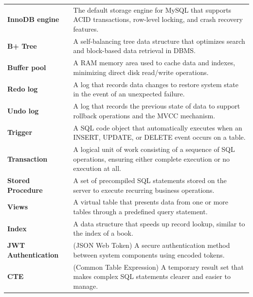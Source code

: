 \documentclass[12pt, a4paper]{report}
\begin{document}
\begin{center}
\begin{tcolorbox}
\begin{tabularx}{\textwidth}{>{\hspace{1em}\bfseries\color{textgreen}}l X<{\hspace{1em}}}
            InnoDB engine & The default storage engine for MySQL that supports ACID transactions, row-level locking, and crash recovery features. \\
            
            B+ Tree & A self-balancing tree data structure that optimizes search and block-based data retrieval in DBMS. \\
            
            Buffer pool & A RAM memory area used to cache data and indexes, minimizing direct disk read/write operations. \\
            
            Redo log & A log that records data changes to restore system state in the event of an unexpected failure. \\
            
            Undo log & A log that records the previous state of data to support rollback operations and the MVCC mechanism. \\
            
            Trigger & A SQL code object that automatically executes when an INSERT, UPDATE, or DELETE event occurs on a table. \\
            
            Transaction & A logical unit of work consisting of a sequence of SQL operations, ensuring either complete execution or no execution at all. \\
            
            Stored Procedure & A set of precompiled SQL statements stored on the server to execute recurring business operations. \\
            
            Views & A virtual table that presents data from one or more tables through a predefined query statement. \\
            
            Index & A data structure that speeds up record lookup, similar to the index of a book. \\
            
            JWT Authentication & (JSON Web Token) A secure authentication method between system components using encoded tokens. \\
            
            CTE & (Common Table Expression) A temporary result set that makes complex SQL statements clearer and easier to manage. \\
            \hline
        \end{tabularx}
    \end{tcolorbox}
\end{center}
\end{document}
